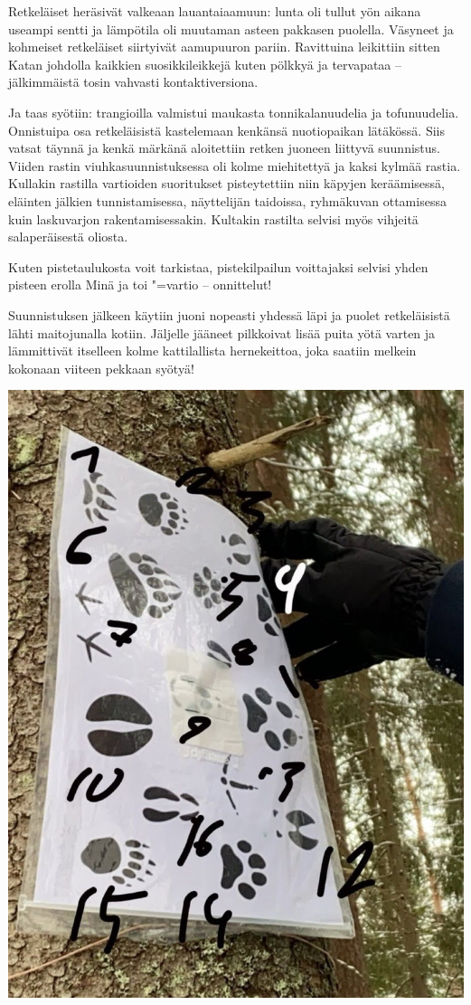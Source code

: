 \begin{multicols}{2}
	Retkeläiset heräsivät valkeaan lauantaiaamuun: lunta oli tullut yön
	aikana useampi sentti ja lämpötila oli muutaman asteen pakkasen
	puolella. Väsyneet ja kohmeiset retkeläiset siirtyivät aamupuuron
	pariin. Ravittuina leikittiin sitten Katan johdolla kaikkien
	suosikkileikkejä kuten pölkkyä ja tervapataa -- jälkimmäistä tosin
	vahvasti kontaktiversiona. 

	Ja taas syötiin: trangioilla valmistui maukasta tonnikalanuudelia ja
	tofunuudelia. Onnistuipa osa retkeläisistä kastelemaan kenkänsä
	nuotiopaikan lätäkössä. Siis vatsat täynnä ja kenkä märkänä aloitettiin
	retken juoneen liittyvä suunnistus. Viiden rastin viuhkasuunnistuksessa
	oli kolme miehitettyä ja kaksi kylmää rastia. Kullakin rastilla
	vartioiden suoritukset pisteytettiin niin käpyjen keräämisessä,
	eläinten jälkien tunnistamisessa, näyttelijän taidoissa, ryhmäkuvan
	ottamisessa kuin laskuvarjon rakentamisessakin. Kultakin rastilta
	selvisi myös vihjeitä salaperäisestä oliosta. 

	Kuten pistetaulukosta voit tarkistaa, pistekilpailun voittajaksi
	selvisi yhden pisteen erolla Minä ja toi "=vartio -- onnittelut!

	Suunnistuksen jälkeen käytiin juoni nopeasti yhdessä läpi ja puolet
	retkeläisistä lähti maitojunalla kotiin. Jäljelle jääneet pilkkoivat
	lisää puita yötä varten ja lämmittivät itselleen kolme kattilallista
	hernekeittoa, joka saatiin melkein kokonaan viiteen pekkaan syötyä!

	\vspace*{0.08cm}
	\noindent\includegraphics[width=\linewidth]{assets/olionpaluu3}


\end{multicols}
